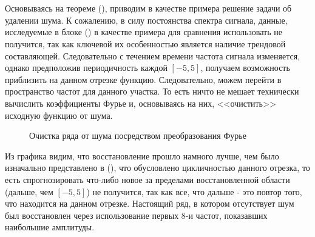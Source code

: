 \\\\
\indent Основываясь на теореме (), приводим в качестве примера решение задачи об удалении шума. К сожалению, в силу постоянства спектра сигнала, данные, исследуемые в блоке () в качестве примера для сравнения использовать не получится, так как ключевой их особенностью является наличие трендовой составляющей. Следовательно с течением времени частота сигнала изменяется, однако предположив периодичность каждой $[-5, 5]$, получаем возможность приблизить на данном отрезке функцию. Следовательно, можем перейти в пространство частот для данного участка. То есть ничто не мешает технически вычислить коэффициенты Фурье и, основываясь на них, <<очистить>> исходную функцию от шума.
\begin{figure}[H]
	\centering
	\caption{Очистка ряда от шума посредством преобразования Фурье}
\end{figure}
Из графика видим, что восстановление прошло намного лучше, чем было изначально представлено в (), что обусловлено цикличностью данного отрезка, то есть спрогнозировать что-либо новое за пределами восстановленной области (дальше, чем $[-5, 5]$) не получится, так как все, что дальше - это повтор того, что находится на данном отрезке. Настоящий ряд, в котором отсутствует шум был восстановлен через  использование первых $8$-и частот, показавших наибольшие амплитуды.

